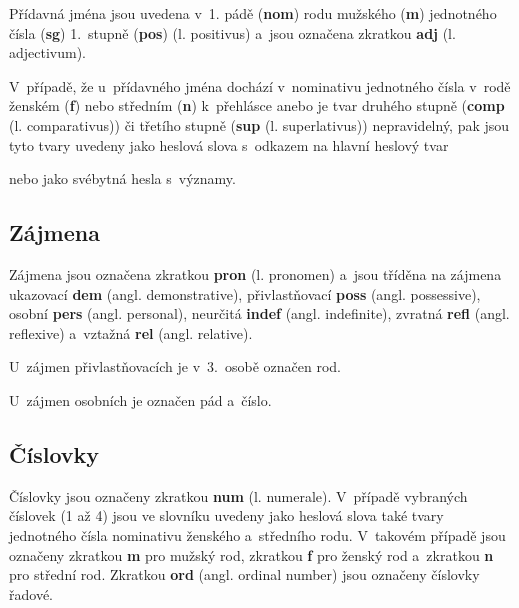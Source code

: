 Přídavná jména jsou uvedena v~1. pádě (\textbf{nom}) rodu mužského (\textbf{m}) jednotného čísla (\textbf{sg}) 1.~stupně (\textbf{pos}) (l. positivus) a~jsou označena zkratkou \textbf{adj} (l. adjectivum).

\blspace
  \dicEntry {} 
\blspace

V~případě, že u~přídavného jména dochází v~nominativu jednotného čísla v~rodě ženském (\textbf{f}) nebo středním (\textbf{n}) k~přehlásce anebo je tvar druhého stupně (\textbf{comp} (l. comparativus)) či třetího stupně (\textbf{sup} (l. superlativus)) nepravidelný, pak jsou tyto tvary uvedeny jako heslová slova s~odkazem na hlavní heslový tvar

\blspace
  \dicEntry {}   
\blspace

nebo jako svébytná hesla s~významy.

\blspace
  \dicEntry {}  
\blspace

\subsection*{Zájmena}

Zájmena jsou označena zkratkou \textbf{pron} (l. pronomen) a~jsou tříděna na zájmena ukazovací \textbf{dem} (angl. demonstrative), přivlastňovací \textbf{poss} (angl. possessive), osobní \textbf{pers} (angl. personal), neurčitá \textbf{indef} (angl. indefinite), zvratná \textbf{refl} (angl. reflexive) a~vztažná \textbf{rel} (angl. relative).

\blspace
  \dicEntry {}  
\blspace

U~zájmen přivlastňovacích je v~3.~osobě označen rod.

\blspace
  \dicEntry {}  
\blspace

U~zájmen osobních je označen pád a~číslo.

\blspace
  \dicEntry {}  
\blspace

\subsection*{Číslovky}

Číslovky jsou označeny zkratkou \textbf{num} (l. numerale). V~případě vybraných číslovek (1 až 4) jsou ve slovníku uvedeny jako heslová slova také tvary jednotného čísla nominativu ženského a~středního rodu. V~takovém případě jsou označeny zkratkou \textbf{m} pro mužský rod, zkratkou \textbf{f} pro ženský rod a~zkratkou \textbf{n} pro střední rod. Zkratkou \textbf{ord} (angl. ordinal number) jsou označeny číslovky řadové.

